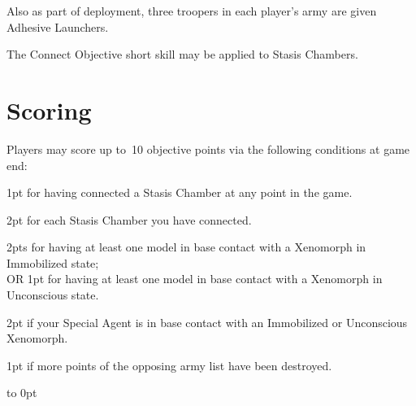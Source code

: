 \medskip%
Also as part of deployment, three troopers in each player's army are
given Adhesive Launchers.

The Connect Objective short skill may be applied to Stasis Chambers.

\vspace*{-8pt}
\section{Scoring}

\vspace*{-4pt}
Players may score up to~10 objective points via the following
conditions at game end:
\begin{squishitemize}
\item 1pt for having connected a Stasis Chamber at any point in the game.
\item 2pt for each Stasis Chamber you have connected.
\item 2pts for having at least one model in base contact with a
  Xenomorph in Immobilized state;\\
  OR 1pt for having at least one model in base contact with a
  Xenomorph in Unconscious state.
\item 2pt if your Special Agent is in base contact with an
  Immobilized or Unconscious Xenomorph.

\item 1pt if more points of the opposing army list have been destroyed.
\end{squishitemize}

\vfill
\vbox to 0pt{}
